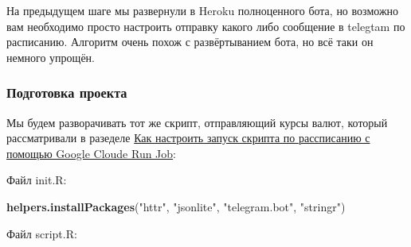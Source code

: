 \documentclass[
]{book}
\newenvironment{Shaded}{\begin{snugshade}}{\end{snugshade}}
\newcommand{\FunctionTok}[1]{\textcolor[rgb]{0.13,0.29,0.53}{\textbf{#1}}}
\newcommand{\NormalTok}[1]{#1}
\newcommand{\StringTok}[1]{\textcolor[rgb]{0.31,0.60,0.02}{#1}}
\begin{document}
На предыдущем шаге мы развернули в Heroku полноценного бота, но возможно вам необходимо просто настроить отправку какого либо сообщение в telegtam по расписанию. Алгоритм очень похож с развёртыванием бота, но всё таки он немного упрощён.

\subsubsection{Подготовка проекта}\label{ux43fux43eux434ux433ux43eux442ux43eux432ux43aux430-ux43fux440ux43eux435ux43aux442ux430}

Мы будем разворачивать тот же скрипт, отправляющий курсы валют, который рассматривали в разеделе \hyperref[ux43aux430ux43a-ux43dux430ux441ux442ux440ux43eux438ux442ux44c-ux437ux430ux43fux443ux441ux43a-ux441ux43aux440ux438ux43fux442ux430-ux43fux43e-ux440ux430ux441ux441ux43fux438ux441ux430ux43dux438ux44e-ux441-ux43fux43eux43cux43eux449ux44cux44e-google-cloude-run-job]{Как настроить запуск скрипта по рассписанию с помощью Google Cloude Run Job}:

Файл init.R:

\begin{Shaded}
\begin{Highlighting}[]
\FunctionTok{helpers.installPackages}\NormalTok{(}\StringTok{"httr"}\NormalTok{, }\StringTok{"jsonlite"}\NormalTok{, }\StringTok{"telegram.bot"}\NormalTok{, }\StringTok{"stringr"}\NormalTok{)}
\end{Highlighting}
\end{Shaded}

Файл script.R:
\end{document}
